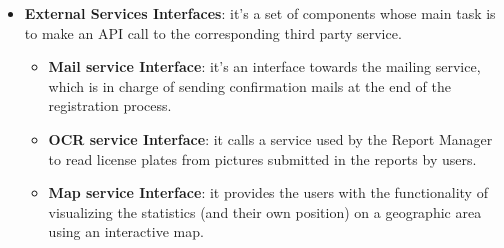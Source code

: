 \documentclass{report}
\begin{document}
\begin{itemize}
\item \textbf{External Services Interfaces}: it's a set of components whose main task is to make an API call to the corresponding third party service.
    \begin{itemize}
        \item \textbf{Mail service Interface}: it's an interface towards the mailing service, which is in charge of sending confirmation mails at the end of the registration process.
        \item \textbf{OCR service Interface}: it calls a service used by the Report Manager to read license plates from pictures submitted in the reports by users.
        \item \textbf{Map service Interface}: it provides the users with the functionality of visualizing the statistics (and their own position) on a geographic area using an interactive map.
\end{itemize} 
\end{itemize}
\end{document}
